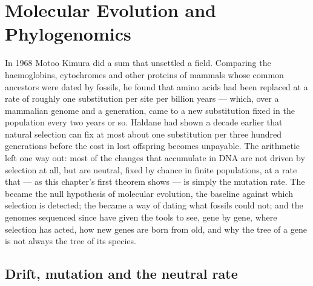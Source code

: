 \chapter{Molecular Evolution and Phylogenomics}\label{ch:b3:molecular-evolution}

In 1968 Motoo Kimura did a sum that unsettled a field. Comparing the
haemoglobins, cytochromes and other proteins of mammals whose common
ancestors were dated by fossils, he found that amino acids had been
replaced at a rate of roughly one substitution per site per billion
years --- which, over a mammalian genome and a generation, came to a
new substitution fixed in the population every two years or so. Haldane
had shown a decade earlier that natural selection can fix at most about
one substitution per three hundred generations before the cost in
lost offspring becomes unpayable. The arithmetic left one way out:
most of the changes that accumulate in DNA are not driven by selection
at all, but are neutral, fixed by chance in finite populations, at a
rate that --- as this chapter's first theorem shows --- is simply the
mutation rate. The  became the null hypothesis of
molecular evolution, the baseline against which selection is detected;
the  became a way of dating what fossils could not;
and the genomes sequenced since have given the tools to see, gene by
gene, where selection has acted, how new genes are born from old, and
why the tree of a gene is not always the tree of its species.

\section{Drift, mutation and the neutral rate}

